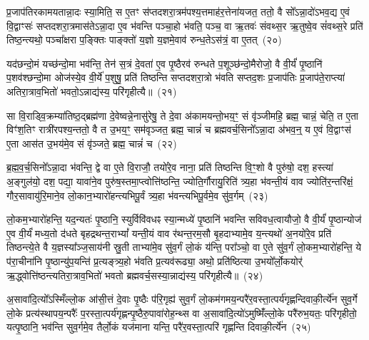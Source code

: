 {\anuvakamend[{ग॒च्छ॒न्त्य॒ग्नि॒ष्टुता॑ पा॒प्मान॒न्निर॒न्तरि॑क्षं लो॒कं प्र॒जायै॒ द्वे च॑}]}

प्र॒जा\-प॑तिरकामयतान्ना॒दः स्या॒मिति॒ स ए॒तꣳ स॑प्तदशरा॒त्रम॑पश्य॒त्तमाह॑र॒त्तेना॑यजत॒ ततो॒ वै सो᳚\-ऽन्ना॒दो॑\-ऽभव॒द्य ए॒वं वि॒द्वाꣳसः॑ सप्तदशरा॒त्रमास॑ते\-ऽन्ना॒दा ए॒व भ॑वन्ति पञ्चा॒हो भ॑वति॒ पञ्च॒ वा ऋ॒तवः॑ संवथ्स॒र ऋ॒तुष्वे॒व सं॑वथ्स॒रे प्रति॑ तिष्ठ॒न्त्यथो॒ पञ्चा᳚क्षरा प॒ङ्क्तिः पाङ्क्तो॑ य॒ज्ञो य॒ज्ञमे॒वाव॑ रुन्ध॒ते\-ऽस॑त्रं॒ वा ए॒तत्~(२०)\ip

यद॑छन्दो॒मं यच्छ॑न्दो॒मा भव॑न्ति॒ तेन॑ स॒त्रं दे॒वता॑ ए॒व पृ॒ष्ठैरव॑ रुन्धते प॒शूञ्छ॑न्दो॒मैरोजो॒ वै वी॒र्यं॑ पृ॒ष्ठानि॑ प॒शव॑श्छन्दो॒मा ओज॑स्ये॒व वी॒र्ये॑ प॒शुषु॒ प्रति॑ तिष्ठन्ति सप्तदशरा॒त्रो भ॑वति सप्तद॒शः प्र॒जा\-प॑तिः प्र॒जा\-प॑ते॒राप्त्या॑ अतिरा॒त्राव॒भितो॑ भवतो॒\-ऽन्नाद्य॑स्य॒ परि॑गृहीत्यै॥~(२१)\ip

{\anuvakamend[{ए॒तथ्स॒प्तत्रिꣴ॑श्चच्च}]}

सा वि॒राड्वि॒क्रम्या॑तिष्ठ॒द्ब्रह्म॑णा दे॒वेष्वन्ने॒नासु॑रेषु॒ ते दे॒वा अ॑कामयन्तो॒भय॒ꣳ॒ सं वृ॑ञ्जीमहि॒ ब्रह्म॒ चान्नं॒ चेति॒ त ए॒ता विꣳ॑श॒तिꣳ रात्री॑रपश्य॒न्ततो॒ वै त उ॒भय॒ꣳ॒ सम॑वृञ्जत॒ ब्रह्म॒ चान्नं॑ च ब्रह्मवर्च॒सिनो᳚\-ऽन्ना॒दा अ॑भव॒न्॒ य ए॒वं वि॒द्वाꣳस॑ ए॒ता आस॑त उ॒भय॑मे॒व सं वृ॑ञ्जते॒ ब्रह्म॒ चान्नं॑ च~(२२)\ip

ब्र॒ह्म॒व॒र्च॒सिनो᳚\-ऽन्ना॒दा भ॑वन्ति॒ द्वे वा ए॒ते वि॒राजौ॒ तयो॑रे॒व नाना॒ प्रति॑ तिष्ठन्ति वि॒ꣳ॒शो वै पुरु॑षो॒ दश॒ हस्त्या॑ अ॒ङ्गुल॑यो॒ दश॒ पद्या॒ यावा॑ने॒व पुरु॑ष॒स्तमा॒प्त्वोत्ति॑ष्ठन्ति॒ ज्योति॒र्गौरायु॒रिति॑ त्र्य॒हा भ॑वन्ती॒यं वाव ज्योति॑र॒न्तरि॑क्षं॒ गौर॒सावायु॑रि॒माने॒व लो॒कान॒भ्यारो॑हन्त्यभिपू॒र्वं त्र्य॒हा भ॑वन्त्यभिपू॒र्वमे॒व सु॑व॒र्गम्~(२३)\ip

लो॒कम॒भ्यारो॑हन्ति॒ यद॒न्यतः॑ पृ॒ष्ठानि॒ स्युर्विवि॑वधꣴ स्या॒न्मध्ये॑ पृ॒ष्ठानि॑ भवन्ति सविवध॒त्वायौजो॒ वै वी॒र्यं॑ पृ॒ष्ठान्योज॑ ए॒व वी॒र्यं॑ मध्य॒तो द॑धते बृहद्रथन्त॒रा\-भ्यां᳚ यन्ती॒यं वाव र॑थन्त॒रम॒सौ बृ॒हदाभ्यामे॒व य॒न्त्यथो॑ अ॒नयो॑रे॒व प्रति॑ तिष्ठन्त्ये॒ते वै य॒ज्ञस्या᳚ञ्ज॒साय॑नी स्रु॒ती ताभ्या॑मे॒व सु॑व॒र्गं लो॒कं य॑न्ति॒ परा᳚ञ्चो॒ वा ए॒ते सु॑व॒र्गं लो॒कम॒भ्यारो॑हन्ति॒ ये प॑रा॒चीना॑नि पृ॒ष्ठान्यु॑प॒यन्ति॑ प्र॒त्यङ्त्र्य॒हो भ॑वति प्र॒त्यव॑रूढ्या॒ अथो॒ प्रति॑ष्ठित्या उ॒भयो᳚र्लो॒कयोर्॑ ऋ॒द्ध्वोत्ति॑ष्ठन्त्यतिरा॒त्राव॒भितो॑ भवतो ब्रह्मवर्च॒सस्या॒न्नाद्य॑स्य॒ परि॑गृहीत्यै॥~(२४)\ip

{\anuvakamend[{वृ॒ञ्ज॒ते॒ ब्रह्म॒ चान्न॑ञ्च सुव॒र्गमे॒ते सु॑व॒र्गन्त्रयो॑विꣳशतिश्च}]}

अ॒सावा॑दि॒त्यो᳚\-ऽस्मिँल्लो॒क आ॑सी॒त्तं दे॒वाः पृ॒ष्ठैः प॑रि॒गृह्य॑ सुव॒र्गं लो॒कम॑गमय॒न्परै॑र॒वस्ता॒त्पर्य॑गृह्णन्दिवाकी॒र्त्ये॑न सुव॒र्गे लो॒के प्रत्य॑स्थापय॒न्परैः᳚ प॒रस्ता॒त्पर्य॑गृह्णन्पृ॒ष्ठैरु॒पावा॑रोह॒न्थ्स वा अ॒सावा॑दि॒त्यो॑\-ऽमुष्मिँ॑ल्लो॒के परै॑रुभ॒यतः॒ परि॑गृहीतो॒ यत्पृ॒ष्ठानि॒ भव॑न्ति सुव॒र्गमे॒व तैर्लो॒कं यज॑माना यन्ति॒ परै॑र॒वस्ता॒त्परि॑ गृह्णन्ति दिवाकी॒र्त्ये॑न~(२५)\ip


